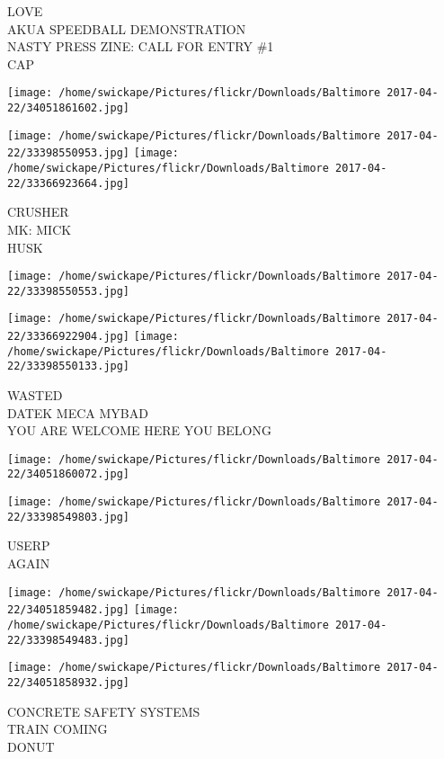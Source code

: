 \documentclass[10pt,letterpaper]{article}
\begin{document}
LOVE\\
AKUA SPEEDBALL DEMONSTRATION\\
NASTY PRESS ZINE: CALL FOR ENTRY \#1\\
CAP
\pagebreak

\texttt{[image: /home/swickape/Pictures/flickr/Downloads/Baltimore 2017-04-22/34051861602.jpg]}

\vspace{0.25in}
\texttt{[image: /home/swickape/Pictures/flickr/Downloads/Baltimore 2017-04-22/33398550953.jpg]}
\texttt{[image: /home/swickape/Pictures/flickr/Downloads/Baltimore 2017-04-22/33366923664.jpg]}

CRUSHER\\
MK: MICK\\
HUSK
\pagebreak

\texttt{[image: /home/swickape/Pictures/flickr/Downloads/Baltimore 2017-04-22/33398550553.jpg]}

\vspace{0.25in}
\texttt{[image: /home/swickape/Pictures/flickr/Downloads/Baltimore 2017-04-22/33366922904.jpg]}
\texttt{[image: /home/swickape/Pictures/flickr/Downloads/Baltimore 2017-04-22/33398550133.jpg]}

WASTED\\
DATEK MECA MYBAD\\
YOU ARE WELCOME HERE YOU BELONG
\pagebreak

\texttt{[image: /home/swickape/Pictures/flickr/Downloads/Baltimore 2017-04-22/34051860072.jpg]}

\vspace{0.25in}
\texttt{[image: /home/swickape/Pictures/flickr/Downloads/Baltimore 2017-04-22/33398549803.jpg]}

USERP\\
AGAIN
\pagebreak

\texttt{[image: /home/swickape/Pictures/flickr/Downloads/Baltimore 2017-04-22/34051859482.jpg]}
\texttt{[image: /home/swickape/Pictures/flickr/Downloads/Baltimore 2017-04-22/33398549483.jpg]}

\texttt{[image: /home/swickape/Pictures/flickr/Downloads/Baltimore 2017-04-22/34051858932.jpg]}

CONCRETE SAFETY SYSTEMS\\
TRAIN COMING\\
DONUT
\pagebreak
\end{document}
